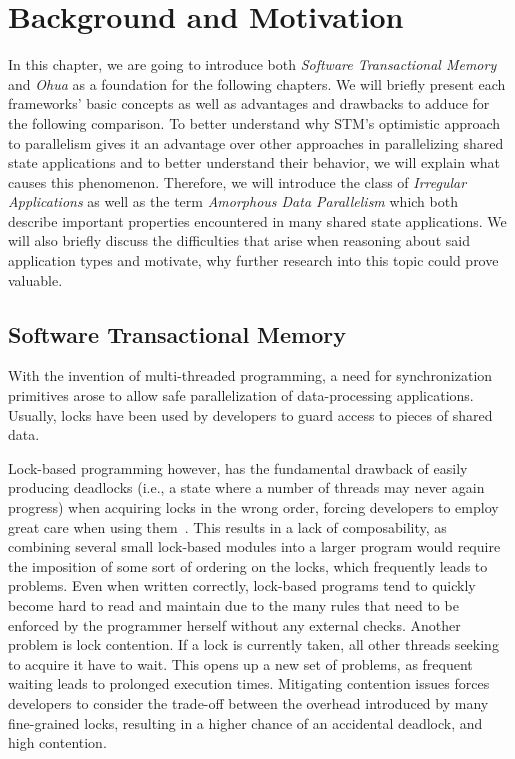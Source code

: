 %
\chapter{Background and Motivation}%
\label{sec:background}

In this chapter, we are going to introduce both \emph{Software Transactional Memory} and \emph{Ohua} as a foundation for the following chapters.
We will briefly present each frameworks' basic concepts as well as advantages and drawbacks to adduce for the following comparison.
To better understand why STM's optimistic approach to parallelism gives it an advantage over other approaches in parallelizing shared state applications and to better understand their behavior, we will explain what causes this phenomenon.
Therefore, we will introduce the class of \emph{Irregular Applications} as well as the term \emph{Amorphous Data Parallelism} which both describe important properties encountered in many shared state applications.
We will also briefly discuss the difficulties that arise when reasoning about said application types and motivate, why further research into this topic could prove valuable.

\section{Software Transactional Memory}
\label{sec:background:stm}

With the invention of multi-threaded programming, a need for synchronization primitives arose to allow safe parallelization of data-processing applications.
Usually, locks have been used by developers to guard access to pieces of shared data.

Lock-based programming however, has the fundamental drawback of easily producing deadlocks (i.e., a state where a number of threads may never again progress) when acquiring locks in the wrong order, forcing developers to employ great care when using them~\cite{lee2006problem}.
This results in a lack of composability, as combining several small lock-based modules into a larger program would require the imposition of some sort of ordering on the locks, which frequently leads to problems.
Even when written correctly, lock-based programs tend to quickly become hard to read and maintain due to the many rules that need to be enforced by the programmer herself without any external checks.
Another problem is lock contention.
If a lock is currently taken, all other threads seeking to acquire it have to wait.
This opens up a new set of problems, as frequent waiting leads to prolonged execution times.
Mitigating contention issues forces developers to consider the trade-off between the overhead introduced by many fine-grained locks, resulting in a higher chance of an accidental deadlock, and high contention.

